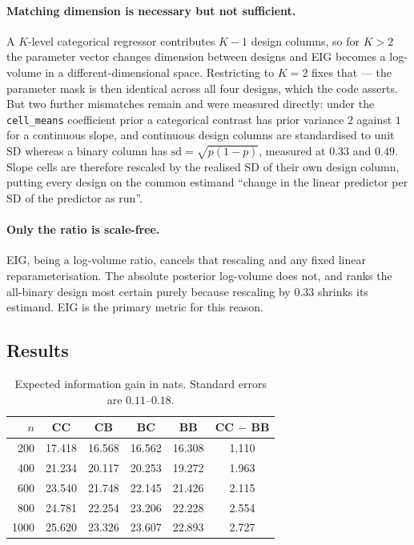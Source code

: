 \documentclass[11pt]{article}
\begin{document}
\paragraph{Matching dimension is necessary but not sufficient.} A $K$-level categorical
regressor contributes $K-1$ design columns, so for $K>2$ the parameter vector changes
dimension between designs and EIG becomes a log-volume in a different-dimensional
space. Restricting to $K=2$ fixes that --- the parameter mask is then identical across
all four designs, which the code asserts. But two further mismatches remain and were
measured directly: under the \texttt{cell\_means} coefficient prior a categorical
contrast has prior variance $2$ against $1$ for a continuous slope, and continuous
design columns are standardised to unit SD whereas a binary column has
$\mathrm{sd}=\sqrt{p(1-p)}$, measured at $0.33$ and $0.49$. Slope cells are therefore
rescaled by the realised SD of their own design column, putting every design on the
common estimand ``change in the linear predictor per SD of the predictor as run''.

\paragraph{Only the ratio is scale-free.} EIG, being a log-volume ratio, cancels that
rescaling and any fixed linear reparameterisation. The absolute posterior log-volume
does not, and ranks the all-binary design most certain purely because rescaling by
$0.33$ shrinks its estimand. EIG is the primary metric for this reason.

\subsection{Results}

\begin{table}[h]
\centering
\begin{tabular}{r cccc c}
\toprule
$n$ & CC & CB & BC & BB & CC $-$ BB \\
\midrule
200  & 17.418 & 16.568 & 16.562 & 16.308 & 1.110 \\
400  & 21.234 & 20.117 & 20.253 & 19.272 & 1.963 \\
600  & 23.540 & 21.748 & 22.145 & 21.426 & 2.115 \\
800  & 24.781 & 22.254 & 23.206 & 22.228 & 2.554 \\
1000 & 25.620 & 23.326 & 23.607 & 22.893 & 2.727 \\
\bottomrule
\end{tabular}
\caption{Expected information gain in nats. Standard errors are $0.11$--$0.18$.}
\label{tab:eig}
\end{table}
\end{document}
